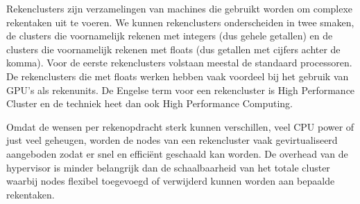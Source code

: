 Rekenclusters zijn verzamelingen van machines die gebruikt worden om complexe rekentaken uit te voeren. We kunnen rekenclusters onderscheiden in twee smaken, de clusters die voornamelijk rekenen met integers (dus gehele getallen) en de clusters die voornamelijk rekenen met floats (dus getallen met cijfers achter de komma). Voor de eerste rekenclusters volstaan meestal de standaard processoren. De rekenclusters die met floats werken hebben vaak voordeel bij het gebruik van GPU's als rekenunits. De Engelse term voor een rekencluster is High Performance Cluster en de techniek heet dan ook High Performance Computing.

Omdat de wensen per rekenopdracht sterk kunnen verschillen, veel CPU power of just veel geheugen, worden de nodes van een rekencluster vaak gevirtualiseerd aangeboden zodat er snel en effici\"ent geschaald kan worden. De overhead van de hypervisor is minder belangrijk dan de schaalbaarheid van het totale cluster waarbij nodes flexibel toegevoegd of verwijderd kunnen worden aan bepaalde rekentaken.
